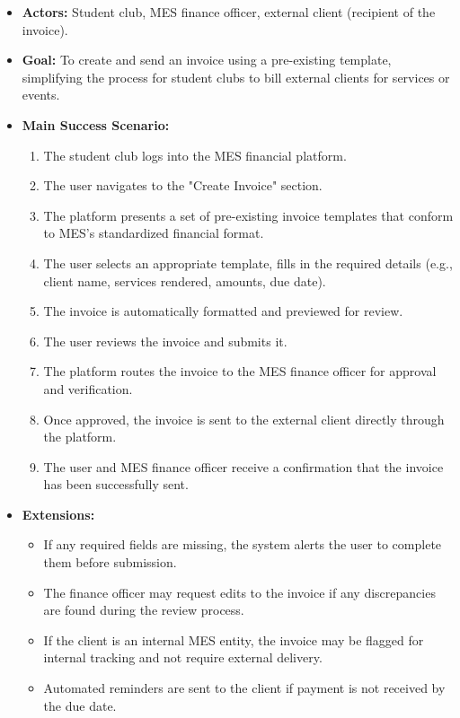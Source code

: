 \documentclass[12pt]{article}
\begin{document}
\begin{itemize}
    \item \textbf{Actors:} Student club, MES finance officer, external client (recipient of the invoice).
    
    \item \textbf{Goal:} To create and send an invoice using a pre-existing template, simplifying the process for student clubs to bill external clients for services or events.
    
    \item \textbf{Main Success Scenario:} 
    \begin{enumerate}
        \item The student club logs into the MES financial platform.
        \item The user navigates to the "Create Invoice" section.
        \item The platform presents a set of pre-existing invoice templates that conform to MES’s standardized financial format.
        \item The user selects an appropriate template, fills in the required details (e.g., client name, services rendered, amounts, due date).
        \item The invoice is automatically formatted and previewed for review.
        \item The user reviews the invoice and submits it.
        \item The platform routes the invoice to the MES finance officer for approval and verification.
        \item Once approved, the invoice is sent to the external client directly through the platform.
        \item The user and MES finance officer receive a confirmation that the invoice has been successfully sent.
    \end{enumerate}
    
    \item \textbf{Extensions:} 
    \begin{itemize}
        \item If any required fields are missing, the system alerts the user to complete them before submission.
        \item The finance officer may request edits to the invoice if any discrepancies are found during the review process.
        \item If the client is an internal MES entity, the invoice may be flagged for internal tracking and not require external delivery.
        \item Automated reminders are sent to the client if payment is not received by the due date.
    \end{itemize}
\end{itemize}
\end{document}
